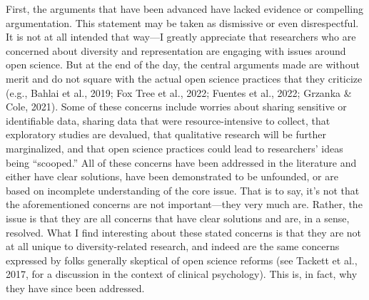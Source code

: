 \documentclass[authordate, empirical,issue]{jote-new-article}
\begin{document}
First, the arguments that have been advanced have lacked evidence or compelling argumentation. This statement may be taken as dismissive or even disrespectful. It is not at all intended that way—I greatly appreciate that researchers who are concerned about diversity and representation are engaging with issues around open science. But at the end of the day, the central arguments made are without merit and do not square with the actual open science practices that they criticize (e.g., Bahlai et al., 2019; Fox Tree et al., 2022; Fuentes et al., 2022; Grzanka \& Cole, 2021). Some of these concerns include worries about sharing sensitive or identifiable data, sharing data that were resource-intensive to collect, that exploratory studies are devalued, that qualitative research will be further marginalized, and that open science practices could lead to researchers' ideas being “scooped.” All of these concerns have been addressed in the literature and either have clear solutions, have been demonstrated to be unfounded, or are based on incomplete understanding of the core issue. That is to say, it's not that the aforementioned concerns are not important—they very much are. Rather, the issue is that they are all concerns that have clear solutions and are, in a sense, resolved. What I find interesting about these stated concerns is that they are not at all unique to diversity-related research, and indeed are the same concerns expressed by folks generally skeptical of open science reforms (see Tackett et al., 2017, for a discussion in the context of clinical psychology). This is, in fact, why they have since been addressed.
\end{document}

